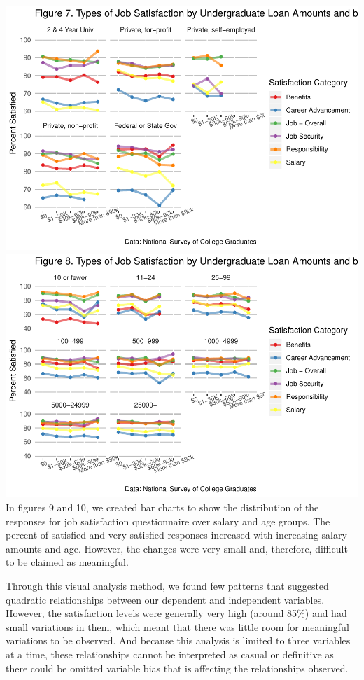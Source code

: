 \documentclass[]{article}
\begin{document}
\includegraphics{Report_Draft_04282019_files/figure-latex/unnamed-chunk-8-1.pdf}
\includegraphics{Report_Draft_04282019_files/figure-latex/unnamed-chunk-9-1.pdf}
In figures 9 and 10, we created bar charts to show the distribution of
the responses for job satisfaction questionnaire over salary and age
groups. The percent of satisfied and very satisfied responses increased
with increasing salary amounts and age. However, the changes were very
small and, therefore, difficult to be claimed as meaningful.

Through this visual analysis method, we found few patterns that
suggested quadratic relationships between our dependent and independent
variables. However, the satisfaction levels were generally very high
(around 85\%) and had small variations in them, which meant that there
was little room for meaningful variations to be observed. And because
this analysis is limited to three variables at a time, these
relationships cannot be interpreted as casual or definitive as there
could be omitted variable bias that is affecting the relationships
observed.
\end{document}

